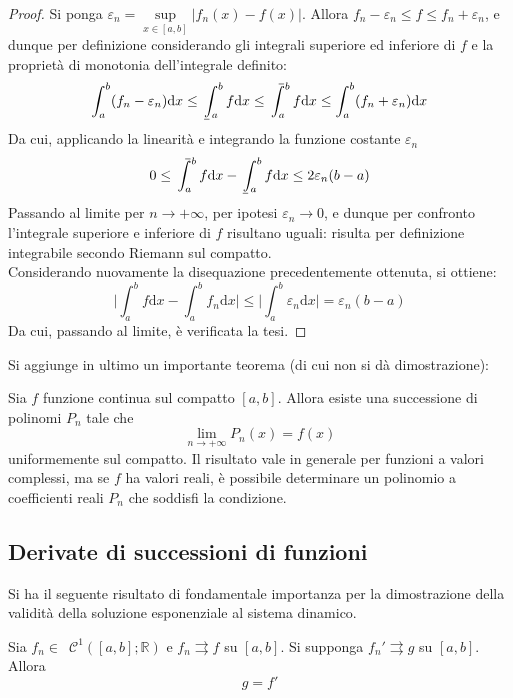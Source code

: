 \documentclass[10pt]{article}
\theoremstyle{plain}
\def\upint{\mathchoice%
    {\mkern13mu\overline{\vphantom{\intop}\mkern7mu}\mkern-20mu}%
    {\mkern7mu\overline{\vphantom{\intop}\mkern7mu}\mkern-14mu}%
    {\mkern7mu\overline{\vphantom{\intop}\mkern7mu}\mkern-14mu}%
    {\mkern7mu\overline{\vphantom{\intop}\mkern7mu}\mkern-14mu}%
  \int}
\def\lowint{\mkern3mu\underline{\vphantom{\intop}\mkern7mu}\mkern-10mu\int}
\begin{document}
\begin{proof}
Si ponga $\displaystyle \varepsilon_n = \sup\limits_{x \in [a,b]} |f_n(x) - f(x)|$. Allora $\displaystyle f_n - \varepsilon_n \leq f \leq f_n + \varepsilon_n$, e dunque per definizione considerando gli integrali superiore ed inferiore di $f$ e la proprietà di monotonia dell'integrale definito:
\[\int_{a}^{b}(f_n - \varepsilon_n)\textrm{d}x \leq \lowint_{a}^{b} f \textrm{d}x \leq \upint_{a}^{b}f\textrm{d}x \leq \int_{a}^{b}(f_n + \varepsilon_n)\textrm{d}x \]
Da cui, applicando la linearità e integrando la funzione costante $\varepsilon_n$
\[0 \leq \upint_{a}^{b}f\textrm{d}x - \lowint_{a}^{b}f\textrm{d}x \leq 2\varepsilon_n (b - a)\]
Passando al limite per $n \rightarrow +\infty$, per ipotesi $\varepsilon_n \rightarrow 0$, e dunque per confronto l'integrale superiore e inferiore di $f$ risultano uguali: risulta per definizione integrabile secondo Riemann sul compatto. 
\\Considerando nuovamente la disequazione precedentemente ottenuta, si ottiene:
\[\bigg|\int_{a}^{b}f\textrm{d}x - \int_{a}^{b}f_n\textrm{d}x\bigg| \leq \bigg|\int_{a}^{b}\varepsilon_n\textrm{d}x\bigg| = \varepsilon_n (b-a)\]
Da cui, passando al limite, è verificata la tesi. 
\end{proof}

Si aggiunge in ultimo un importante teorema (di cui non si dà dimostrazione):
\begin{ther}
Sia $f$ funzione continua sul compatto $[a,b]$. Allora esiste una successione di polinomi $P_n$ tale che
\[\lim\limits_{n \rightarrow +\infty} P_n(x) = f(x)\]
uniformemente sul compatto. Il risultato vale in generale per funzioni a valori complessi, ma se $f$ ha valori reali, è possibile determinare un polinomio a coefficienti reali $P_n$ che soddisfi la condizione.
\end{ther}

\subsection{Derivate di successioni di funzioni}
Si ha il seguente risultato di fondamentale importanza per la dimostrazione della validità della soluzione esponenziale al sistema dinamico.
\begin{ther}
Sia $f_n \in \enspace \mathcal{C}^{1}([a,b] ; \mathbb{R})$ e $f_n \rightrightarrows f$ su $[a,b]$. Si supponga $f_n' \rightrightarrows g$ su $[a,b]$. Allora
\[g = f'\]
\end{ther}
\end{document}
